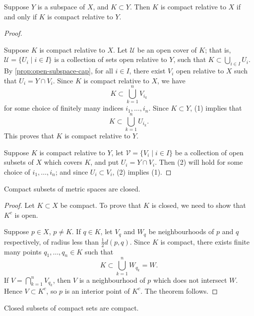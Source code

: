\begin{proposition}
Suppose $Y$ is a subspace of $X$, and $K\subset Y$. Then $K$ is compact relative to $X$ if and only if $K$ is compact relative to $Y$.
\end{proposition}

\begin{proof} \

\fbox{$\implies$} Suppose $K$ is compact relative to $X$. Let $\mathcal{U}$ be an open cover of $K$; that is, $\mathcal{U}=\{U_i\mid i\in I\}$ is a collection of sets open relative to $Y$, such that $K\subset\bigcup_{i\in I}U_i$. 
By \cref{prop:open-subspace-cap}, for all $i\in I$, there exist $V_i$ open relative to $X$ such that $U_i=Y\cap V_i$. Since $K$ is compact relative to $X$, we have
\begin{equation*}\tag{1}
K\subset\bigcup_{k=1}^{n}V_{i_k}
\end{equation*}
for some choice of finitely many indices $i_1,\dots,i_n$. Since $K\subset Y$, (1) implies that
\begin{equation*}\tag{2}
K\subset\bigcup_{k=1}^{n}U_{i_k}.
\end{equation*}
This proves that $K$ is compact relative to $Y$.

\fbox{$\impliedby$} Suppose $K$ is compact relative to $Y$, let $\mathcal{V}=\{V_i\mid i\in I\}$ be a collection of open subsets of $X$ which covers $K$, and put $U_i=Y\cap V_i$. Then (2) will hold for some choice of $i_1,\dots,i_n$; and since $U_i\subset V_i$, (2) implies (1).
\end{proof}

\begin{proposition}
Compact subsets of metric spaces are closed.
\end{proposition}

\begin{proof}
Let $K\subset X$ be compact. To prove that $K$ is closed, we need to show that $K^c$ is open.

Suppose $p\in X$, $p\neq K$. If $q\in K$, let $V_q$ and $W_q$ be neighbourhoods of $p$ and $q$ respectively, of radius less than $\frac{1}{2}d(p,q)$. Since $K$ is compact, there exists finite many points $q_1,\dots,q_n\in K$ such that
\[K\subset\bigcup_{k=1}^{n}W_{q_k}=W.\]
If $V=\bigcap_{k=1}^{n}V_{q_k}$, then $V$ is a neighbourhood of $p$ which does not intersect $W$. Hence $V\subset K^c$, so $p$ is an interior point of $K^c$. The theorem follows.
\end{proof}

\begin{proposition}
Closed subsets of compact sets are compact.
\end{proposition}


